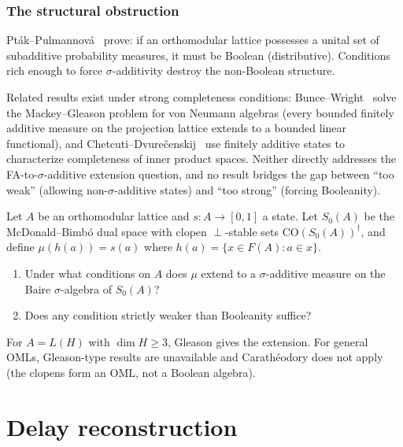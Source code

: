 \subsubsection{The structural obstruction}

Pt\'{a}k--Pulmannov\'{a}~\cite{PtakPulmannova1994} prove: if an
orthomodular lattice possesses a unital set of subadditive probability
measures, it must be Boolean (distributive).  Conditions rich enough
to force $\sigma$-additivity destroy the non-Boolean structure.

Related results exist under strong completeness conditions:
Bunce--Wright~\cite{BunceWright1992} solve the Mackey--Gleason problem
for von Neumann algebras (every bounded finitely additive measure on
the projection lattice extends to a bounded linear functional),
and Chetcuti--Dvure\v{c}enskij~\cite{ChetcutiDvurecenskij2003} use
finitely additive states to characterize completeness of inner product
spaces.  Neither directly addresses the FA-to-$\sigma$-additive
extension question, and no result bridges the gap between ``too weak''
(allowing non-$\sigma$-additive states) and ``too strong'' (forcing
Booleanity).

\begin{openproblem}
\label{op:oml-extension}
Let $A$ be an orthomodular lattice and
$s \colon A \to [0,1]$ a state.  Let $S_0(A)$ be the
McDonald--Bimb\'{o} dual space with clopen $\perp$-stable sets
$\mathrm{CO}(S_0(A))^\dagger$, and define $\mu(h(a)) = s(a)$ where
$h(a) = \{x \in F(A) : a \in x\}$.
\begin{enumerate}[label=(\alph*),nosep]
  \item Under what conditions on $A$ does $\mu$ extend to a
    $\sigma$-additive measure on the Baire $\sigma$-algebra of
    $S_0(A)$?
  \item Does any condition strictly weaker than Booleanity suffice?
\end{enumerate}
\end{openproblem}

For $A = L(H)$ with $\dim H \geq 3$, Gleason gives the extension.
For general OMLs, Gleason-type results are unavailable and
Carath\'{e}odory does not apply (the clopens form an OML, not a
Boolean algebra).

\section{Delay reconstruction}
\label{sec:reconstruction}

